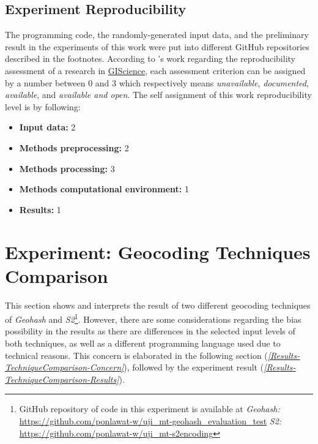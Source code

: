 \subsection*{Experiment Reproducibility}

\npara The programming code, the randomly-generated input data, and the preliminary result in the experiments of this work were put into different GitHub repositories described in the footnotes.
According to \cite{Reproducibility}'s work regarding the reproducibility assessment of a research in \hyperref[Acronym-GIScience]{GIScience}, each assessment criterion can be assigned by a number between 0 and 3 which respectively means \textit{unavailable}, \textit{documented}, \textit{available}, and \textit{available and open}.
The self assignment of this work reproducibility level is by following:
\begin{itemize}
  \item \textbf{Input data:} 2
  \item \textbf{Methods preprocessing:} 2
  \item \textbf{Methods processing:} 3
  \item \textbf{Methods computational environment:} 1
  \item \textbf{Results:} 1
\end{itemize}

\newpage

\section{Experiment: Geocoding Techniques Comparison} \label{Results-TechniqueComparison}

\npara This section shows and interprets the result of two different geocoding techniques of \textit{Geohash} and \textit{S2}\footnote{GitHub repository of code in this experiment is available at\newline
\textit{Geohash: }\url{https://github.com/ponlawat-w/uji_mt-geohash_evaluation_test}\newline
\textit{S2: }\url{https://github.com/ponlawat-w/uji_mt-s2encoding}}.
However, there are some considerations regarding the bias possibility in the results as there are differences in the selected input levels of both techniques, as well as a different programming language used due to technical reasons.
This concern is elaborated in the following section (\textit{\ref{Results-TechniqueComparison-Concern}}), followed by the experiment result (\textit{\ref{Results-TechniqueComparison-Results}}).

